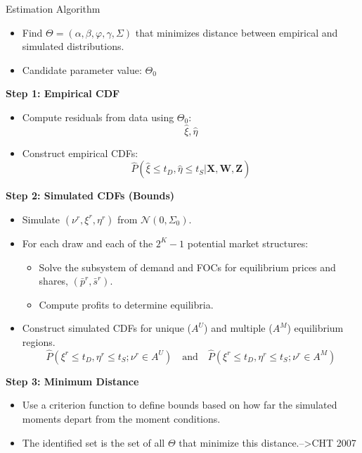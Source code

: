 \documentclass{beamer}
\begin{document}
\begin{frame}{Estimation Algorithm}
    \begin{itemize}
        \item Find $\Theta = (\alpha, \beta, \varphi, \gamma, \Sigma)$ that minimizes distance between empirical and simulated distributions.
        \item Candidate parameter value: $\Theta_0$
    \end{itemize}
    \vspace{0.2cm}
    \textbf{Step 1: Empirical CDF}
    \begin{itemize}
        \item Compute residuals from data using $\Theta_0$:
        \[\hat{\xi}, \hat{\eta}\]
        \item Construct empirical CDFs:
        \[
        \hat{P}(\hat{\xi} \leq t_D, \hat{\eta} \leq t_S | \textbf{X}, \textbf{W}, \textbf{Z})
        \]
    \end{itemize}
    \vspace{0.2cm}
    \textbf{Step 2: Simulated CDFs (Bounds)}
    \begin{itemize}
        \item Simulate $(\nu^r, \xi^r, \eta^r)$ from $\mathcal{N}(0, \Sigma_0)$.
        \item For each draw and each of the $2^K-1$ potential market structures:
        \begin{itemize}
            \item Solve the subsystem of demand and FOCs for equilibrium prices and shares, $(\bar{p}^r, \bar{s}^r)$.
            \item Compute profits to determine equilibria.
        \end{itemize}
        \item Construct simulated CDFs for unique ($A^U$) and multiple ($A^M$) equilibrium regions.
        \[
        \hat{P}(\xi^r \leq t_D, \eta^r \leq t_S; \nu^r \in A^U) \quad \text{and} \quad \hat{P}(\xi^r \leq t_D, \eta^r \leq t_S; \nu^r \in A^M)
        \]
    \end{itemize}
    \vspace{0.2cm}
    \textbf{Step 3: Minimum Distance}
    \begin{itemize}
        \item Use a criterion function to define bounds based on how far the simulated moments depart from the moment conditions.
        \item The identified set is the set of all $\Theta$ that minimize this distance.-->CHT 2007
    \end{itemize}
\end{frame}
\end{document}
